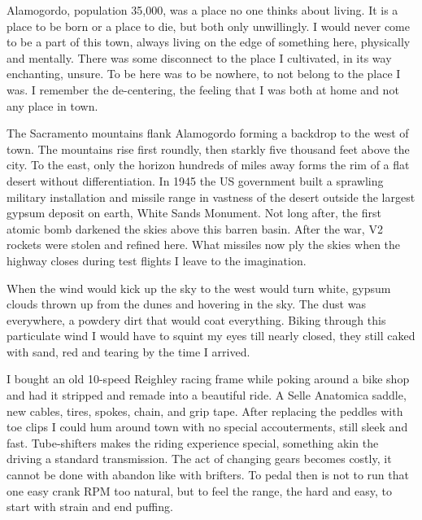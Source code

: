 \documentclass[ebook, 10pt, openright, onecolumn]{memoir}
\newlength{\drop}
\begin{document}
Alamogordo, population 35,000, was a place no one thinks about living.  It is a
place to be born or a place to die, but both only unwillingly.  I would never
come to be a part of this town, always living on the edge of something here,
physically and mentally.  There was some disconnect to the place I cultivated,
in its way enchanting, unsure.  To be here was to be nowhere, to not belong to
the place I was.  I remember the de-centering, the feeling that I was both at
home and not any place in town.

The Sacramento mountains flank Alamogordo forming a backdrop to the west of
town.  The mountains rise first roundly, then starkly five thousand feet above
the city.  To the east, only the horizon hundreds of miles away forms the rim of
a flat desert without differentiation.  In 1945 the US government built a
sprawling military installation and missile range in vastness of the desert
outside the largest gypsum deposit on earth, White Sands Monument.  Not long
after, the first atomic bomb darkened the skies above this barren basin.  After
the war, V2 rockets were stolen and refined here.  What missiles now ply the
skies when the highway closes during test flights I leave to the imagination.

When the wind would kick up the sky to the west would turn white, gypsum clouds
thrown up from the dunes and hovering in the sky.  The dust was everywhere, a
powdery dirt that would coat everything.  Biking through this particulate wind I
would have to squint my eyes till nearly closed, they still caked with sand, red
and tearing by the time I arrived.  

I bought an old 10-speed Reighley racing frame while poking around a bike shop
and had it stripped and remade into a beautiful ride.  A Selle Anatomica saddle,
new cables, tires, spokes, chain, and grip tape.  After replacing the peddles
with toe clips I could hum around town with no special accouterments, still
sleek and fast. Tube-shifters makes the riding experience special, something
akin the driving a standard transmission.  The act of changing gears becomes
costly, it cannot be done with abandon like with brifters.  To pedal then is not
to run that one easy crank RPM too natural, but to feel the range, the hard and
easy, to start with strain and end puffing.
\end{document}
